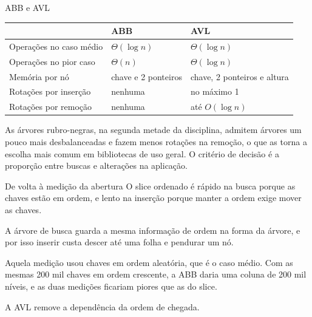 \documentclass{beamer}
\begin{document}
\begin{frame}{ABB e AVL}
  \begin{center}
    \footnotesize
    \begin{tabular}{lll}
      \toprule
       & \textbf{ABB} & \textbf{AVL} \\
      \midrule
      Operações no caso médio & $\Theta(\log n)$ & $\Theta(\log n)$ \\
      Operações no pior caso & $\Theta(n)$ & $\Theta(\log n)$ \\
      Memória por nó & chave e 2 ponteiros & chave, 2 ponteiros e altura \\
      Rotações por inserção & nenhuma & no máximo 1 \\
      Rotações por remoção & nenhuma & até $O(\log n)$ \\
      \bottomrule
    \end{tabular}
  \end{center}

  \vspace{0.5cm}
  As árvores rubro-negras, na segunda metade da disciplina, admitem árvores um
  pouco mais desbalanceadas e fazem menos rotações na remoção, o que as torna a
  escolha mais comum em bibliotecas de uso geral. O critério de decisão é a
  proporção entre buscas e alterações na aplicação.
\end{frame}

\begin{frame}{De volta à medição da abertura}
  O slice ordenado é rápido na busca porque as chaves estão em ordem, e lento na
  inserção porque manter a ordem exige mover as chaves.

  \vspace{0.3cm}
  A árvore de busca guarda a mesma informação de ordem na forma da árvore, e por
  isso inserir custa descer até uma folha e pendurar um nó.

  \vspace{0.5cm}
  Aquela medição usou chaves em ordem aleatória, que é o caso médio. Com as
  mesmas 200 mil chaves em ordem crescente, a ABB daria uma coluna de 200 mil
  níveis, e as duas medições ficariam piores que as do slice.

  \vspace{0.3cm}
  A AVL remove a dependência da ordem de chegada.
\end{frame}
\end{document}

